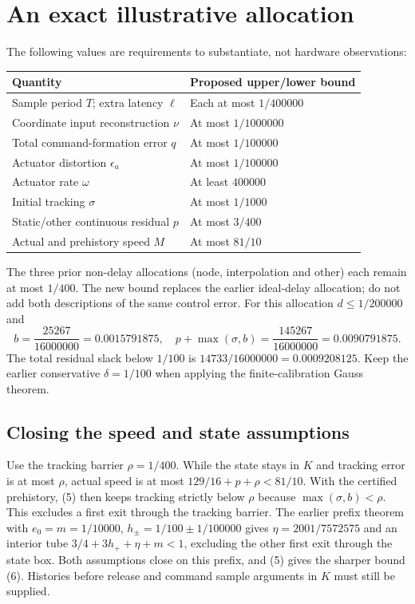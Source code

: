\documentclass[10pt,a4paper]{article}
\begin{document}
\section{An exact illustrative allocation}
The following values are requirements to substantiate, not hardware observations:
\begin{center}
\begin{tabular}{ll}
\toprule
Quantity & Proposed upper/lower bound\\
\midrule
Sample period $T$; extra latency $\ell$ & Each at most $1/400000$\\
Coordinate input reconstruction $\nu$ & At most $1/1000000$\\
Total command-formation error $q$ & At most $1/100000$\\
Actuator distortion $\epsilon_a$ & At most $1/100000$\\
Actuator rate $\omega$ & At least $400000$\\
Initial tracking $\sigma$ & At most $1/1000$\\
Static/other continuous residual $p$ & At most $3/400$\\
Actual and prehistory speed $M$ & At most $81/10$\\
\bottomrule
\end{tabular}
\end{center}
The three prior non-delay allocations (node, interpolation and other) each remain at most $1/400$. The new bound replaces the earlier ideal-delay allocation; do not add both descriptions of the same control error.
\newpage
For this allocation $d\leq1/200000$ and
\begin{equation}
b=\frac{25267}{16000000}=0.0015791875,\quad
p+\max(\sigma,b)=\frac{145267}{16000000}=0.0090791875 .
\end{equation}
The total residual slack below $1/100$ is
$14733/16000000=0.0009208125$. Keep the earlier conservative $\delta=1/100$ when applying the finite-calibration Gauss theorem.

\subsection*{Closing the speed and state assumptions}
Use the tracking barrier $\rho=1/400$. While the state stays in $K$ and tracking error is at most $\rho$, actual speed is at most $129/16+p+\rho<81/10$. With the certified prehistory, (5) then keeps tracking strictly below $\rho$ because $\max(\sigma,b)<\rho$. This excludes a first exit through the tracking barrier. The earlier prefix theorem with $e_0=m=1/10000$, $h_\pm=1/100\pm1/100000$ gives
$\eta=2001/7572575$ and an interior tube
$3/4+3h_++\eta+m<1$, excluding the other first exit through the state box. Both assumptions close on this prefix, and (5) gives the sharper bound (6). Histories before release and command sample arguments in $K$ must still be supplied.
\end{document}
